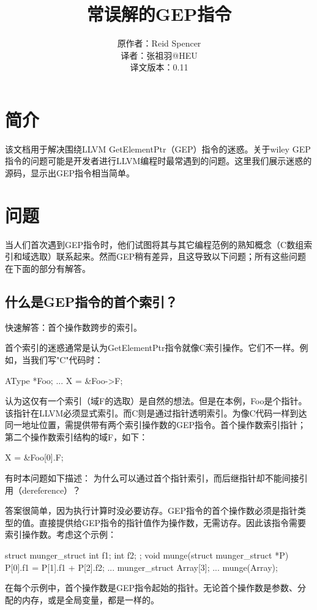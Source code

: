 \documentclass[12pt,a4paper]{article}
\title{常误解的GEP指令}
\author{原作者：Reid Spencer\\译者：张祖羽@HEU\\译文版本：0.11}
\begin{document}
\maketitle

\section{简介}

该文档用于解决围绕LLVM GetElementPtr（GEP）指令的迷惑。关于wiley GEP指令的问题可能是开发者进行LLVM编程时最常遇到的问题。这里我们展示迷惑的源码，显示出GEP指令相当简单。

\section{问题}

当人们首次遇到GEP指令时，他们试图将其与其它编程范例的熟知概念（C数组索引和域选取）联系起来。然而GEP稍有差异，且这导致以下问题；所有这些问题在下面的部分有解答。

\subsection{什么是GEP指令的首个索引？}

快速解答：首个操作数跨步的索引。

首个索引的迷惑通常是认为GetElementPtr指令就像C索引操作。它们不一样。例如，当我们写"C"代码时：

AType *Foo;
...
X = \&Foo->F;

认为这仅有一个索引（域F的选取）是自然的想法。但是在本例，Foo是个指针。该指针在LLVM必须显式索引。而C则是通过指针透明索引。为像C代码一样到达同一地址位置，需提供带有两个索引操作数的GEP指令。首个操作数索引指针；第二个操作数索引结构的域F，如下：

X = \&Foo[0].F;

有时本问题如下描述：
为什么可以通过首个指针索引，而后继指针却不能间接引用（dereference）？

答案很简单，因为执行计算时没必要访存。GEP指令的首个操作数必须是指针类型的值。直接提供给GEP指令的指针值作为操作数，无需访存。因此该指令需要索引操作数。考虑这个示例：

struct munger\_struct {
  int f1;
  int f2;
};
void munge(struct munger\_struct *P) {
  P[0].f1 = P[1].f1 + P[2].f2;
}
...
munger\_struct Array[3];
...
munge(Array);

在每个示例中，首个操作数是GEP指令起始的指针。无论首个操作数是参数、分配的内存，或是全局变量，都是一样的。
\end{document}
